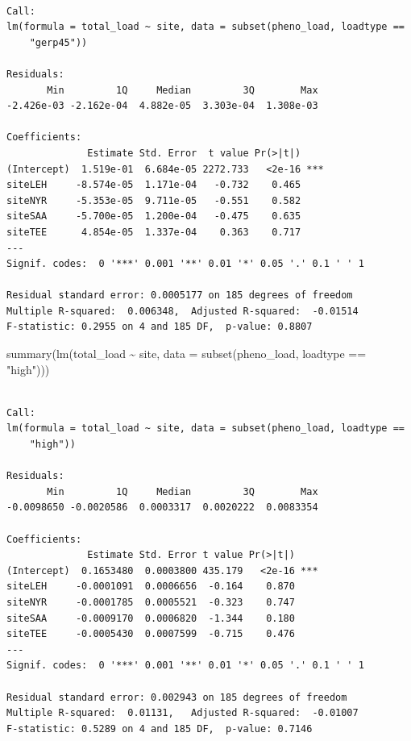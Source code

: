 \documentclass[
  letterpaper,
  DIV=11,
  numbers=noendperiod]{scrreprt}
\newenvironment{Shaded}{}{}
\newcommand{\AttributeTok}[1]{\textcolor[rgb]{0.84,0.23,0.29}{#1}}
\newcommand{\FunctionTok}[1]{\textcolor[rgb]{0.44,0.26,0.76}{#1}}
\newcommand{\NormalTok}[1]{\textcolor[rgb]{0.14,0.16,0.18}{#1}}
\newcommand{\SpecialCharTok}[1]{\textcolor[rgb]{0.00,0.36,0.77}{#1}}
\newcommand{\StringTok}[1]{\textcolor[rgb]{0.01,0.18,0.38}{#1}}
\begin{document}
\begin{verbatim}

Call:
lm(formula = total_load ~ site, data = subset(pheno_load, loadtype == 
    "gerp45"))

Residuals:
       Min         1Q     Median         3Q        Max 
-2.426e-03 -2.162e-04  4.882e-05  3.303e-04  1.308e-03 

Coefficients:
              Estimate Std. Error  t value Pr(>|t|)    
(Intercept)  1.519e-01  6.684e-05 2272.733   <2e-16 ***
siteLEH     -8.574e-05  1.171e-04   -0.732    0.465    
siteNYR     -5.353e-05  9.711e-05   -0.551    0.582    
siteSAA     -5.700e-05  1.200e-04   -0.475    0.635    
siteTEE      4.854e-05  1.337e-04    0.363    0.717    
---
Signif. codes:  0 '***' 0.001 '**' 0.01 '*' 0.05 '.' 0.1 ' ' 1

Residual standard error: 0.0005177 on 185 degrees of freedom
Multiple R-squared:  0.006348,  Adjusted R-squared:  -0.01514 
F-statistic: 0.2955 on 4 and 185 DF,  p-value: 0.8807
\end{verbatim}

\begin{Shaded}
\begin{Highlighting}[]
\FunctionTok{summary}\NormalTok{(}\FunctionTok{lm}\NormalTok{(total\_load }\SpecialCharTok{\textasciitilde{}}\NormalTok{ site, }\AttributeTok{data =} \FunctionTok{subset}\NormalTok{(pheno\_load, loadtype }\SpecialCharTok{==} \StringTok{"high"}\NormalTok{)))}
\end{Highlighting}
\end{Shaded}

\begin{verbatim}

Call:
lm(formula = total_load ~ site, data = subset(pheno_load, loadtype == 
    "high"))

Residuals:
       Min         1Q     Median         3Q        Max 
-0.0098650 -0.0020586  0.0003317  0.0020222  0.0083354 

Coefficients:
              Estimate Std. Error t value Pr(>|t|)    
(Intercept)  0.1653480  0.0003800 435.179   <2e-16 ***
siteLEH     -0.0001091  0.0006656  -0.164    0.870    
siteNYR     -0.0001785  0.0005521  -0.323    0.747    
siteSAA     -0.0009170  0.0006820  -1.344    0.180    
siteTEE     -0.0005430  0.0007599  -0.715    0.476    
---
Signif. codes:  0 '***' 0.001 '**' 0.01 '*' 0.05 '.' 0.1 ' ' 1

Residual standard error: 0.002943 on 185 degrees of freedom
Multiple R-squared:  0.01131,   Adjusted R-squared:  -0.01007 
F-statistic: 0.5289 on 4 and 185 DF,  p-value: 0.7146
\end{verbatim}
\end{document}
